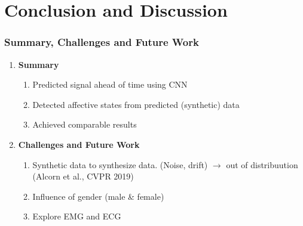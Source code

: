 \documentclass[unknownkeysallowed]{beamer}
\begin{document}
\section{Conclusion and Discussion}

\begin{frame}
\frametitle{Summary, Challenges and Future Work}

\begin{enumerate}[]
    \pause \item \textbf{Summary} \\
        \begin{enumerate}[-]
            \item Predicted signal ahead of time using CNN
            \item Detected affective states from predicted (synthetic) data 
            \item Achieved comparable results \newline 
        \end{enumerate}
        
    \pause \item \textbf{Challenges and Future Work} \\
    
        \begin{enumerate}[-]
        \item Synthetic data to synthesize data. (Noise, drift) $\longrightarrow$ out of distribuution (Alcorn et al., CVPR 2019)
        \item Influence of gender (male \& female) 
        \item Explore EMG and ECG
        \end{enumerate}
\end{enumerate}

\end{frame}






\end{document}
